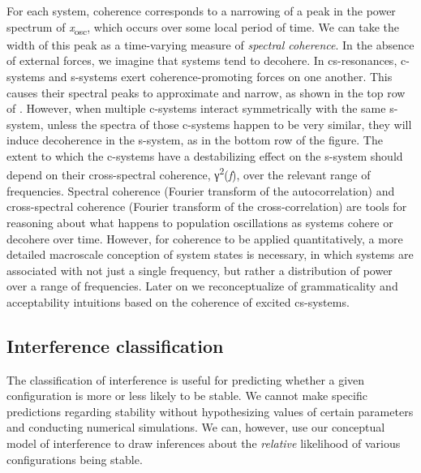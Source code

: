   For each system, coherence corresponds to a narrowing of a peak in the power spectrum of \textit{x}\textsubscript{osc}, which occurs over some local period of time. We can take the width of this peak as a time-varying measure of \textit{spectral coherence}. In the absence of external forces, we imagine that systems tend to decohere. In cs-resonances, c-systems and s-systems exert coherence-promoting forces on one another. This causes their spectral peaks to approximate and narrow, as shown in the top row of {}. However, when multiple c-systems interact symmetrically with the same s-system, unless the spectra of those c-systems happen to be very similar, they will induce decoherence in the s-system, as in the bottom row of the figure. The extent to which the c-systems have a destabilizing effect on the s-system should depend on their cross-spectral coherence, γ\textsuperscript{2}(\textit{f}), over the relevant range of frequencies. Spectral coherence (Fourier transform of the autocorrelation) and cross-spectral coherence (Fourier transform of the cross-correlation) are tools for reasoning about what happens to population oscillations as systems cohere or decohere over time. However, for coherence to be applied quantitatively, a more detailed macroscale conception of system states is necessary, in which systems are associated with not just a single frequency, but rather a distribution of power over a range of frequencies. Later on we reconceptualize of grammaticality and acceptability intuitions based on the coherence of excited cs-systems.

\subsection{Interference classification}

The classification of interference is useful for predicting whether a given configuration is more or less likely to be stable. We cannot make specific predictions regarding stability without hypothesizing values of certain parameters and conducting numerical simulations. We can, however, use our conceptual model of interference to draw inferences about the \textit{relative} likelihood of various configurations being stable.

